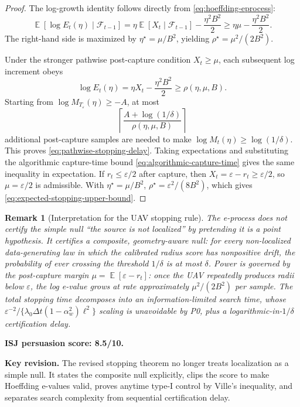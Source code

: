 \documentclass[11pt]{article}
\newtheorem{remark}[theorem]{Remark}
\DeclareMathOperator{\E}{\mathbb{E}}
\newcommand{\dt}{\Delta t}
\begin{document}
\begin{proof}
The log-growth identity follows directly from \eqref{eq:hoeffding-eprocess}:
\[
        \E[\log E_t(\eta)\mid\mathcal{F}_{t-1}]
        =
        \eta\E[X_t\mid\mathcal{F}_{t-1}]
        -
        \frac{\eta^2B^2}{2}
        \geq
        \eta\mu-\frac{\eta^2B^2}{2}.
\]
The right-hand side is maximized by $\eta^\star=\mu/B^2$, yielding $\rho^\star=\mu^2/(2B^2)$.

Under the stronger pathwise post-capture condition $X_t\geq\mu$, each subsequent log increment obeys
\[
        \log E_t(\eta)
        =
        \eta X_t-\frac{\eta^2B^2}{2}
        \geq
        \rho(\eta,\mu,B).
\]
Starting from $\log M_{T_{\varepsilon}}(\eta)\geq-A$, at most
\[
        \left\lceil
        \frac{A+\log(1/\delta)}
             {\rho(\eta,\mu,B)}
        \right\rceil
\]
additional post-capture samples are needed to make $\log M_t(\eta)\geq\log(1/\delta)$.  This proves \eqref{eq:pathwise-stopping-delay}.  Taking expectations and substituting the algorithmic capture-time bound \eqref{eq:algorithmic-capture-time} gives the same inequality in expectation.  If $r_t\leq\varepsilon/2$ after capture, then $X_t=\varepsilon-r_t\geq\varepsilon/2$, so $\mu=\varepsilon/2$ is admissible.  With $\eta^\star=\mu/B^2$, $\rho^\star=\varepsilon^2/(8B^2)$, which gives \eqref{eq:expected-stopping-upper-bound}.
\end{proof}

\begin{remark}[Interpretation for the UAV stopping rule]\label{rem:eprocess-physical}
The e-process does not certify the simple null ``the source is not localized'' by pretending it is a point hypothesis.  It certifies a composite, geometry-aware null: for every non-localized data-generating law in which the calibrated radius score has nonpositive drift, the probability of ever crossing the threshold $1/\delta$ is at most $\delta$.  Power is governed by the post-capture margin $\mu=\E[\varepsilon-r_t]$: once the UAV repeatedly produces radii below $\varepsilon$, the log e-value grows at rate approximately $\mu^2/(2B^2)$ per sample.  The total stopping time decomposes into an information-limited search time, whose $\varepsilon^{-2}/\{\lambda_0\dt(1-\alpha_w^2)\ell^2\}$ scaling is unavoidable by P0, plus a logarithmic-in-$1/\delta$ certification delay.
\end{remark}

\noindent\textbf{ISJ persuasion score: 8.5/10.}

\noindent\textbf{Key revision.}
The revised stopping theorem no longer treats localization as a simple null.  It states the composite null explicitly, clips the score to make Hoeffding e-values valid, proves anytime type-I control by Ville's inequality, and separates search complexity from sequential certification delay.
\end{document}

